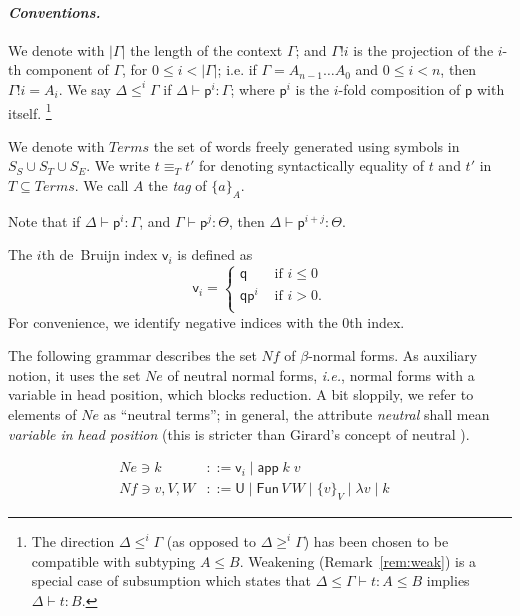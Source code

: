 \documentclass{LMCS}
\renewcommand{\leq}{\leqslant}
\theoremstyle{plain}\newtheorem{satz}[thm]{Satz}
\def\ie{{\em i.e.}}
\newcommand{\LONGVERSION}[1]{#1}
\newcommand{\SHORTVERSION}[1]{}
\newcommand{\derN}{\vdash}
\newcommand{\TmU}{\mathsf{U}}
\newcommand{\F}[2]{\mathsf{Fun}\,#1\,#2}
\newcommand{\p}{\mathsf{p}}
\newcommand{\q}{\mathsf{q}}
\newcommand{\appTm}[2]{\mathsf{app}\;#1\;#2} \newcommand{\singTm}[2]{\{#1\}_{#2}}
\newcommand{\ind}[1]{\mathsf{v}_{#1}}
\newcommand{\dsubs}[3]{#1\vdash#3:#2}
\newcommand{\terms}{\mathit{Terms}}
\newcommand{\neterms}{\mathit{Ne}}
\newcommand{\nfterms}{\mathit{Nf}}
\newcommand{\LONGVERSION}[1]{}
\newcommand{\SHORTVERSION}[1]{#1}
\newcommand{\LONGSHORT}[2]{\LONGVERSION{#1}\SHORTVERSION{#2}}
\newcommand{\para}[1]{
\LONGSHORT{\paragraph{\it #1.}}
          {\vspace{1ex}\noindent{\it #1.}}
}
\begin{document}
\para{Conventions}
We denote with $|\Gamma|$ the length of the context $\Gamma$; and
$\Gamma!i$ is the projection of the $i$-th component of $\Gamma$, for
$0\leqslant i < |\Gamma|$; i.e. if $\Gamma=A_{n-1}\ldots A_{0}$ and
$0 \leqslant i < n$, then $\Gamma!i = A_{i}$. We say
$\Delta\leqslant^{i}\Gamma$ if $\dsubs{\Delta}{\Gamma}{\p^{i}}$; where
$\p^i$ is the $i$-fold composition of $\p$ with itself.  
\footnote{The direction
$\Delta\leqslant^{i}\Gamma$ (as opposed to
$\Delta\geqslant^{i}\Gamma$) has been chosen to be compatible with
subtyping $A \leqslant B$.  Weakening (Remark~\ref{rem:weak}) is a
special case of subsumption which states that $\Delta \leqslant \Gamma
\derN t : A \leqslant B$ implies $\Delta \derN t : B$.}

We denote with $\terms$ the set of words freely generated using symbols in
$S_S\cup S_T\cup S_E$.  We write $t \equiv_T t'$ for denoting
syntactically equality of $t$ and $t'$ in $T \subseteq \terms$. We
call $A$ the {\em tag} of $\singTm{a}{A}$.

\LONGVERSION{
\begin{rem}
  \label{rem:lift}
  Note that if $\dsubs{\Delta}{\Gamma}{\p^i}$, and
  $\dsubs{\Gamma}{\Theta}{\p^j}$, then
  $\dsubs{\Delta}{\Theta}{\p^{i+j}}$.
\end{rem}
}
\begin{defi} The $i$th de~Bruijn index $\ind i$
  is defined as
\[
  \ind i = \left\{
    \begin{array}{ll}
      \q     & \mbox{ if } i \leq  0 \\
      \q\p^i & \mbox{ if } i > 0 . \\
    \end{array}
\right.
\]
For convenience, we identify negative indices with the 0th index.
\end{defi}
The following grammar describes the set $\nfterms$ of $\beta$-normal
forms.  As auxiliary notion, 
it uses the set $\neterms$ of neutral normal forms, \ie,
normal forms with a variable in head position, which blocks reduction.
A bit sloppily, we refer to elements of $\neterms$ as ``neutral
terms''; in general, the attribute \emph{neutral} shall mean
\emph{variable in head position} (this is stricter than Girard's
concept of neutral \cite{girardLafontTaylor:proofsAndTypes}).
\begin{defi}
  \label{def:nfterms}
  \begin{align*}
    \neterms \ni k &::= \ind i \mid \appTm{k}{v}&\\
    \nfterms \ni v, V,W &::= \TmU \mid \F{V}{W} \mid \singTm{v}{V}
    \mid \lambda v\mid k&
\end{align*}
\end{defi}\medskip
\end{document}
